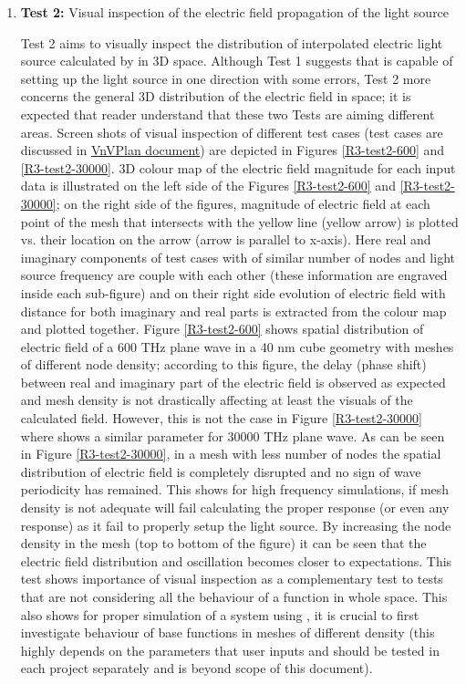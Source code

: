 \documentclass[12pt, titlepage]{article}
\begin{document}
\begin{enumerate}
    
\item{\textbf{Test 2:}  Visual inspection of the electric field propagation of the light source\\}


	Test 2 aims to visually inspect the distribution of interpolated electric light source calculated by \progname{} in 3D space. Although Test 1 suggests that \progname{} is capable of setting up the light source in one direction with some errors, Test 2 more concerns the general 3D distribution of the electric field in space; it is expected that reader understand that these two Tests are aiming different areas. Screen shots of visual inspection of different test cases (test cases are discussed in \href{https://github.com/shmouses/SPDFM/tree/master/docs/VnVPlan}{VnVPlan document}) are depicted in Figures \ref{R3-test2-600} and \ref{R3-test2-30000}. 3D colour map of the electric field magnitude for each input data is illustrated on the left side of the Figures \ref{R3-test2-600} and \ref{R3-test2-30000}; on the right side of the figures, magnitude of electric field at each point of the mesh that intersects with the yellow line (yellow arrow) is plotted vs. their location on the arrow (arrow is parallel to x-axis). Here real and imaginary components of test cases with of similar number of nodes and light source frequency are couple with each other (these information are engraved inside each sub-figure) and on their right side evolution of electric field with distance for both imaginary and real parts is extracted from the colour map and plotted together. 
	Figure \ref{R3-test2-600} shows spatial distribution of electric field of a 600 THz plane wave in a 40 nm cube geometry with meshes of different node density; according to this figure, the delay (phase shift) between real and imaginary part of the electric field is observed as expected and mesh density is not drastically affecting at least the visuals of the calculated field. However, this is not the case in Figure \ref{R3-test2-30000} where shows a similar parameter for 30000 THz plane wave. As can be seen in Figure \ref{R3-test2-30000}, in a mesh with less number of nodes the spatial distribution of electric field is completely disrupted and no sign of wave periodicity has remained. This shows for high frequency simulations, if mesh density is not adequate \progname{} will fail calculating the proper response (or even any response) as it fail to properly setup the light source. By increasing the node density in the mesh (top to bottom of the figure) it can be seen that the electric field distribution and oscillation becomes closer to expectations. This test shows importance of visual inspection as a complementary test to tests that are not considering all the behaviour of a function in whole space. This also shows for proper simulation of a system using \progname{}, it is crucial to first investigate behaviour of base functions in meshes of different density (this highly depends on the parameters that user inputs and should be tested in each project separately and is beyond scope of this document).      

\end{enumerate}
\end{document}
